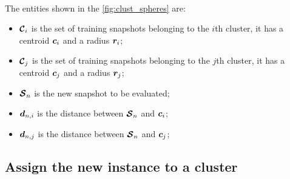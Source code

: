 \paragraph*{}
The entities shown in the \autoref{fig:clust_spheres} are:
\begin{itemize}
  \item $\bm{\mathcal{C}}_i$ is the set of training snapshots belonging to the $i$th cluster, it has a centroid $\bm{c}_i$ and a radius $\bm{r}_i$;
  \item $\bm{\mathcal{C}}_j$ is the set of training snapshots belonging to the $j$th cluster, it has a centroid $\bm{c}_j$ and a radius $\bm{r}_j$;
  \item $\bm{\mathcal{S}}_n$ is the new snapshot to be evaluated;
  \item $\bm{d}_{n,i}$ is the distance between $\bm{\mathcal{S}}_n$ and $\bm{c}_i$;
  \item $\bm{d}_{n,j}$ is the distance between $\bm{\mathcal{S}}_n$ and $\bm{c}_j$;
\end{itemize}

\subsection{Assign the new instance to a cluster} 
